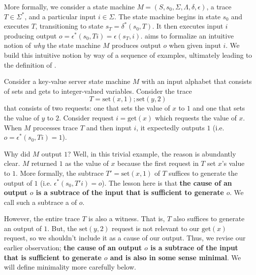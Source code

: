 More formally, we consider a state machine $M = (S, s_0, \Sigma, \Lambda,
\delta, \epsilon)$, a trace $T \in \Sigma^*$, and a particular input $i \in
\Sigma$. The state machine begins in state $s_0$ and executes $T$,
transitioning to state $s_T = \delta^*(s_0, T)$. It then executes input $i$
producing output $o = \epsilon^*(s_0, Ti) = \epsilon(s_T, i)$. \Watprovenance{}
aims to formalize an intuitive notion of \emph{why} the state machine $M$
produces output $o$ when given input $i$. We build this intuitive notion by way
of a sequence of examples, ultimately leading to the definition of
\watprovenance{}.

\begin{example}
  \newcommand{\kvset}{\text{set}}
  \newcommand{\kvget}{\text{get}}
  Consider a key-value server state machine $M$ with an input alphabet that
  consists of sets and gets to integer-valued variables. Consider the trace
  \[
    T = \kvset(x, 1); \kvset(y, 2)
  \]
  that consists of two requests: one that sets the value of $x$ to $1$ and one
  that sets the value of $y$ to $2$. Consider request $i = \kvget(x)$ which
  requests the value of $x$. When $M$ processes trace $T$ and then input $i$,
  it expectedly outputs $1$ (i.e.\ $o = \epsilon^*(s_0, Ti) = 1$).

  Why did $M$ output $1$? Well, in this trivial example, the reason is
  abundantly clear. $M$ returned $1$ as the value of $x$ because the first
  request in $T$ set $x$'s value to $1$. More formally, the subtrace $T' =
  \kvset(x, 1)$ of $T$ suffices to generate the output of $1$ (i.e.
  $\epsilon^*(s_0, T'i) = o$). The lesson here is that \textbf{the cause of an
  output $o$ is a subtrace of the input that is sufficient to generate $o$}. We
  call such a subtrace a  of $o$.

  However, the entire trace $T$ is also a witness. That is, $T$ also suffices
  to generate an output of $1$. But, the $\kvset(y, 2)$ request is not relevant
  to our $\kvget(x)$ request, so we shouldn't include it as a cause of our
  output. Thus, we revise our earlier observation; \textbf{the cause of an
  output $o$ is a subtrace of the input that is sufficient to generate $o$ and
  is also in some sense minimal}. We will define minimality more carefully
  below.
\end{example}

